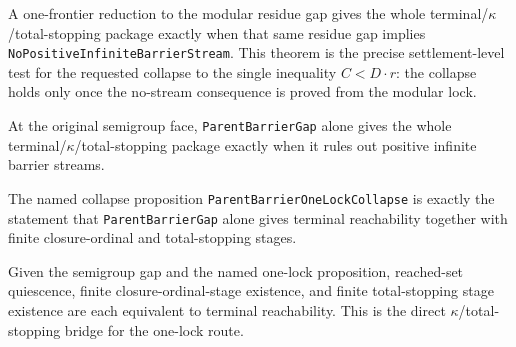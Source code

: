 \begin{theorem}
  \label{thm:collatz-one-frontier-kappa-package}
  \leanok
  A one-frontier reduction to the modular residue gap gives the whole
  terminal/\(\kappa\)/total-stopping package exactly when that same residue gap
  implies \texttt{NoPositiveInfiniteBarrierStream}. This theorem is the precise
  settlement-level test for the requested collapse to the single inequality
  \(C < D\cdot r\): the collapse holds only once the no-stream
  consequence is proved from the modular lock.
\end{theorem}
\begin{theorem}
  \label{thm:collatz-parent-gap-kappa-package}
  \leanok
  At the original semigroup face, \texttt{ParentBarrierGap} alone gives the whole
  terminal/\(\kappa\)/total-stopping package exactly when it rules out positive
  infinite barrier streams.
\end{theorem}
\begin{theorem}
  \label{thm:collatz-parent-one-lock-kappa-package}
  \leanok
  The named collapse proposition \texttt{ParentBarrierOneLockCollapse} is exactly
  the statement that \texttt{ParentBarrierGap} alone gives terminal reachability
  together with finite closure-ordinal and total-stopping stages.
\end{theorem}
\begin{theorem}
  \label{thm:collatz-parent-one-lock-kappa-bridge}
  \leanok
  Given the semigroup gap and the named one-lock proposition, reached-set
  quiescence, finite closure-ordinal-stage existence, and finite total-stopping
  stage existence are each equivalent to terminal reachability. This is the
  direct \(\kappa\)/total-stopping bridge for the one-lock route.
\end{theorem}
